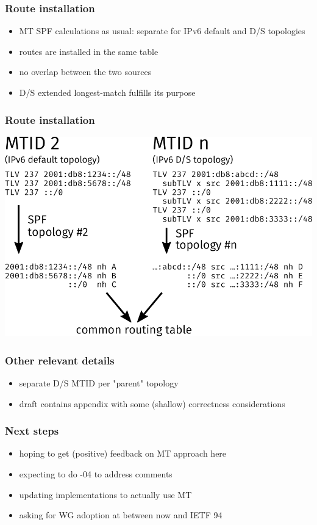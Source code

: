 \documentclass[12pt]{beamer}
\begin{document}
\begin{frame}
  \frametitle{Route installation}
  \begin{itemize}
    \item MT SPF calculations as usual: separate for IPv6 default and D/S topologies
    \item routes are installed in the same table
    \item no overlap between the two sources
    \item D/S extended longest-match fulfills its purpose
  \end{itemize}
\end{frame}

\begin{frame}
  \frametitle{Route installation}
  \begin{center}
    \includegraphics[scale=0.65,angle=0]{isis_93_mtmerge.pdf}%
  \end{center}
\end{frame}

\begin{frame}
  \frametitle{Other relevant details}
  \begin{itemize}
    \item separate D/S MTID per "parent" topology
    \item draft contains appendix with some (shallow) correctness considerations
  \end{itemize}
\end{frame}

\begin{frame}
  \frametitle{Next steps}
  \begin{itemize}
    \item hoping to get (positive) feedback on MT approach here
    \item expecting to do -04 to address comments
    \item updating implementations to actually use MT
    \item asking for WG adoption at between now and IETF 94
  \end{itemize}
\end{frame}
\end{document}
